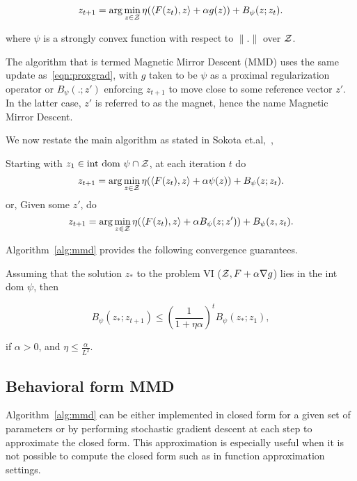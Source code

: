 \begin{equation}
	\label{eqn:proxgrad} z_{t+1} = \arg \min_{z \in \mathcal{Z}} \eta (\langle F(z_t), z\rangle + \alpha
	g(z)) + B_{\psi} (z; z_t).
\end{equation}

where $\psi$ is a strongly convex function with respect to $\|.\|$ over $\mathcal{Z}$.

The algorithm that is termed Magnetic Mirror Descent (MMD) uses the same update as~\ref{eqn:proxgrad}, with $g$ taken to be
$\psi$ as a proximal regularization operator or $B_{\psi}(.;z')$ enforcing $z_{t+1}$ to move close to some reference vector 
$z'$. In the latter case, $z'$ is referred to as the magnet, hence the name Magnetic Mirror Descent.

We now restate the main algorithm as stated in Sokota et.al,~\cite{sokotaUnified2023},

\begin{alprocedure}[H]  \label{alg:mmd} Starting with $z_1 \in \text{int dom } \psi \cap \mathcal{Z}$,
	at each iteration $t$ do $$ z_{t+1} = \arg \min_{z \in \mathcal{Z}} \eta (\langle F(z_t), z\rangle +
		\alpha \psi(z)) + B_{\psi} (z; z_t).
	$$
	or,
	Given some $z'$, do $$ z_{t+1} = \arg \min_{z \in \mathcal{Z}} \eta (\langle F(z_t), z\rangle + \alpha
		B_{\psi}(z; z')) + B_{\psi} (z, z_t).
	$$
\end{alprocedure}

\hfill \break
Algorithm~\ref{alg:mmd} provides the following convergence guarantees.

\begin{theorem}
	\label{thm:mmdconv}
	\cite[Theorem 3.4]{sokotaUnified2023}
	Assuming that the solution $z_{\ast}$ to the problem VI ($\mathcal{Z}, F + \alpha \nabla g$) lies in the
	int dom $\psi$, then

	\[ B_{\psi} (z_{\ast}; z_{t + 1}) \leq {\left(\frac{1}{1 +
				\eta \alpha}\right)}^t B_{\psi} (z_{\ast}; z_1), \]

	if $\alpha > 0$, and $\eta
		\leq \frac{\alpha}{L^2}$.
\end{theorem}

\subsection{Behavioral form MMD}

Algorithm~\ref{alg:mmd} can be either implemented in closed form for a given set of parameters or
by performing stochastic gradient descent at each step to approximate the closed form.
This approximation is especially useful when it is not possible to compute the closed form such as
in function approximation settings.

